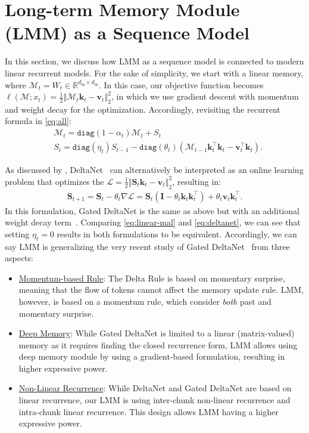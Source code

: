 \documentclass{article}
\newcommand{\citep}{\parencite}
\newcommand{\citet}{\textcite}
\newcommand{\R}[0]{\mathbb{R}}
\newcommand{\M}[0]{\mathcal{M}}
\newcommand{\head}[1]{\vspace{1.7mm}\noindent{{\textcolor{c3}{\bf #1.}}}}
\begin{document}
\section{Long-term Memory Module (LMM) as a Sequence Model}\label{app:MAS}
In this section, we discuss how LMM as a sequence model is connected to modern linear recurrent models. For the sake of simplicity, we start with a linear memory, where $\M_t = W_t \in \R^{d_{\text{in}} \times d_{\text{in}}}$. In this case, our objective function becomes $\ell(\M; x_t) = \frac{1}{2}\left\Vert \M_{t}\mathbf{k}_t - \mathbf{v}_t  \right \Vert_2^2$, in which we use gradient descent with momentum and weight decay for the optimization. Accordingly, revisiting the recurrent formula in \autoref{eq:all}:   
\begin{align}\label{eq:linear-mal}
    &\M_t =  \texttt{diag}\left(1 - \alpha_t\right)\M_t + S_t \\
    &S_t = \texttt{diag}\left(\eta_t \right)S_{t-1} - \texttt{diag}\left(\theta_t \right) \left( \M_{t-1} \mathbf{k}_t^\top \mathbf{k}_t - \mathbf{v}_t^{\top} \mathbf{k}_t \right).
\end{align}

\head{LMM is Generalized Gated DeltaNet} As discussed by \citet{yang2024gated}, DeltaNet~\citep{yang2024parallelizing} can alternatively be interpreted as an online learning problem that optimizes the $\mathcal{L} = \frac{1}{2}\left\Vert \mathbf{S}_{t}\mathbf{k}_t - \mathbf{v}_t  \right \Vert_2^2$, resulting in:
\begin{align}\label{eq:deltanet}
    \mathbf{S}_{t+1} = \mathbf{S}_{t} - \theta_t \nabla \mathcal{L} = \mathbf{S}_{t} \left( \mathbf{I} - \theta_t \mathbf{k}_t\mathbf{k}_t^{\top} \right) + \theta_t \mathbf{v}_t\mathbf{k}^{\top}_t.
\end{align}
In this formulation, Gated DeltaNet is the same as above but with an additional weight decay term~\citep{yang2024gated}. Comparing \autoref{eq:linear-mal} and \autoref{eq:deltanet}, we can see that setting $\eta_t = 0$ results in both formulations to be equivalent. Accordingly, we can say LMM is generalizing the very recent study of Gated DeltaNet~\citep{yang2024gated} from three aspects: 
\begin{itemize}
    \item \underline{Momentum-based Rule}: The Delta Rule is based on momentary surprise, meaning that the flow of tokens cannot affect the memory update rule. LMM, however, is based on a momentum rule, which consider \emph{both} past and momentary surprise.
    \item \underline{Deep Memory}: While Gated DeltaNet is limited to a linear (matrix-valued) memory as it requires finding the closed recurrence form, LMM allows using deep memory module by using a gradient-based formulation, resulting in higher expressive power.
    \item \underline{Non-Linear Recurrence}: While DeltaNet and Gated DeltaNet are based on linear recurrence, our LMM is using inter-chunk non-linear recurrence and intra-chunk  linear recurrence. This design allows LMM having a higher expressive power.
\end{itemize}
\end{document}
